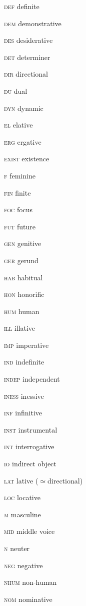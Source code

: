 \begin{refsection}
\begin{multicols}{2}
	\textsc{def}  definite
	
	\textsc{dem}  demonstrative
	
	\textsc{des}  desiderative
	
	\textsc{det}  determiner
	
	\textsc{dir}  directional
	
	\textsc{du}  dual
	
	\textsc{dyn}  dynamic
	
	\textsc{el}  elative
	
	\textsc{erg}  ergative
	
	\textsc{exist}  existence
	
	\textsc{f}  feminine
	
	\textsc{fin}  finite
	
	\textsc{foc}  focus
	
	\textsc{fut}  future
	
	\textsc{gen}  genitive

	
	\textsc{ger}  gerund
	
	\textsc{hab}  habitual
	
	\textsc{hon}  honorific
	
	\textsc{hum}  human
	
	\textsc{ill}  illative
	
	\textsc{imp}  imperative
	
	\textsc{ind}  indefinite
	
	\textsc{indep}  independent
	
	\textsc{iness}  inessive
	
	\textsc{inf}  infinitive
	
	\textsc{inst}  instrumental
	
	\textsc{int}  interrogative
	
	\textsc{io}  indirect object
	
	\textsc{lat}  lative (${\simeq}$directional)
	
	\textsc{loc}  locative
	
	\textsc{m}  masculine
	
	\textsc{mid}  middle voice
	
	\textsc{n}  neuter
	
	\textsc{neg}  negative
	
	\textsc{nhum}  non-human
	
	\textsc{nom}  nominative
	

\end{multicols}
\end{refsection}
